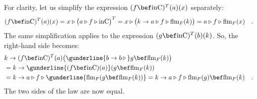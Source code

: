 For clarity, let us simplify the expression $(f\bef\text{inC})^{T}(a)(x)$
separately:
\[
(f\bef\text{inC})^{T}(a)(x)=x\triangleright\big(a\triangleright f\triangleright\text{inC}\big)^{T}=x\triangleright\big(k\rightarrow a\triangleright f\triangleright\text{flm}_{F}(k)\big)=a\triangleright f\triangleright\text{flm}_{F}(x)\quad.
\]
The same simplification applies to the expression $(g\bef\text{inC})^{T}(b)(k)$.
So, the right-hand side becomes:
\begin{align*}
 & k\rightarrow(f\bef\text{inC})^{T}(a)\big(\gunderline{b\rightarrow b\,\triangleright\,}g\bef\text{flm}_{F}(k)\big)\\
 & =k\rightarrow\gunderline{(f\bef\text{inC})(a)}(g\bef\text{flm}_{F}(k))\\
 & =k\rightarrow a\triangleright f\triangleright\gunderline{\text{flm}_{F}(g\bef\text{flm}_{F}(k))}=k\rightarrow a\triangleright f\triangleright\text{flm}_{F}(g)\bef\text{flm}_{F}(k)\quad.
\end{align*}
The two sides of the law are now equal.


